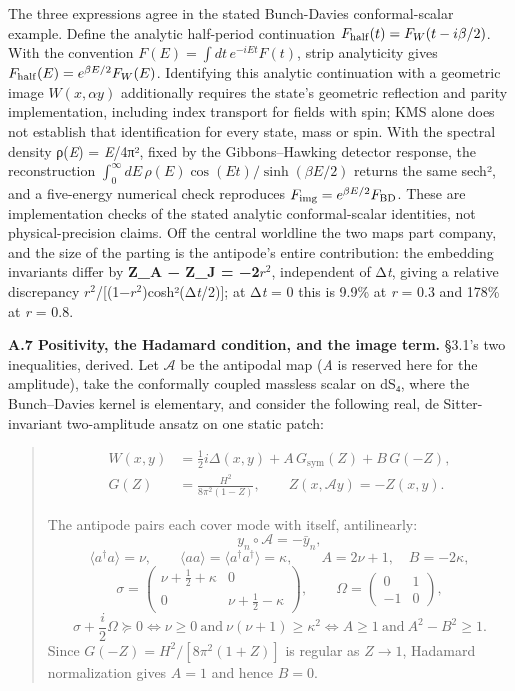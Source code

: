 \documentclass[
]{article}
\begin{document}
The three expressions agree in the stated Bunch-Davies conformal-scalar
example. Define the analytic half-period continuation
\(F_{\rm half}(t)=F_W(t-i\beta/2)\). With the convention
\(F(E)=\int dt\,e^{-iEt}F(t)\), strip analyticity gives
\(F_{\rm half}(E)=e^{\beta E/2}F_W(E)\). Identifying this analytic
continuation with a geometric image \(W(x,\alpha y)\) additionally
requires the state's geometric reflection and parity implementation,
including index transport for fields with spin; KMS alone does not
establish that identification for every state, mass or spin. With the
spectral density ρ(\emph{E}) = \emph{E}/4π², fixed by the
Gibbons--Hawking detector response, the reconstruction
\(\int_0^\infty dE\,\rho(E)\cos(Et)/\sinh(\beta E/2)\) returns the same
sech², and a five-energy numerical check reproduces
\(F_{\rm img}=e^{\beta E/2}F_{\rm BD}\). These are implementation checks
of the stated analytic conformal-scalar identities, not
physical-precision claims. Off the central worldline the two maps part
company, and the size of the parting is the antipode's entire
contribution: the embedding invariants differ by \textbf{Z\_A − Z\_J =
−2\(r^2\)}, independent of Δ\emph{t}, giving a relative discrepancy
\(r^2\)/{[}(1−\(r^2\))cosh²(Δ\emph{t}/2){]}; at Δ\emph{t} = 0 this is
9.9\% at \emph{r} = 0.3 and 178\% at \emph{r} = 0.8.

\textbf{A.7 Positivity, the Hadamard condition, and the image term.}
§3.1's two inequalities, derived. Let \(\mathcal{A}\) be the antipodal
map (\emph{A} is reserved here for the amplitude), take the conformally
coupled massless scalar on dS₄, where the Bunch--Davies kernel is
elementary, and consider the following real, de Sitter-invariant
two-amplitude ansatz on one static patch:

\begin{quote}
\[
\begin{aligned}
W(x,y)&=\tfrac12 i\Delta(x,y)+A\,G_{\mathrm{sym}}(Z)+B\,G(-Z),\\
G(Z)&=\frac{H^2}{8\pi^2(1-Z)},\qquad Z(x,\mathcal A y)=-Z(x,y).
\end{aligned}
\]

The antipode pairs each cover mode with itself, antilinearly: \[
y_n\circ\mathcal A=-\bar y_n,
\] \[
\langle a^\dagger a\rangle=\nu,\qquad
\langle aa\rangle=\langle a^\dagger a^\dagger\rangle=\kappa,
\qquad A=2\nu+1,\quad B=-2\kappa,
\] \[
\sigma=\begin{pmatrix}\nu+\tfrac12+\kappa&0\\0&\nu+\tfrac12-\kappa\end{pmatrix},
\qquad
\Omega=\begin{pmatrix}0&1\\-1&0\end{pmatrix},
\] \[
\sigma+\frac{i}{2}\Omega\succeq0
\Longleftrightarrow\nu\ge0\ \text{and}\ \nu(\nu+1)\ge\kappa^2
\Longleftrightarrow A\ge1\ \text{and}\ A^2-B^2\ge1.
\] Since \(G(-Z)=H^2/[8\pi^2(1+Z)]\) is regular as \(Z\to1\), Hadamard
normalization gives \(A=1\) and hence \(B=0\).
\end{quote}
\end{document}
